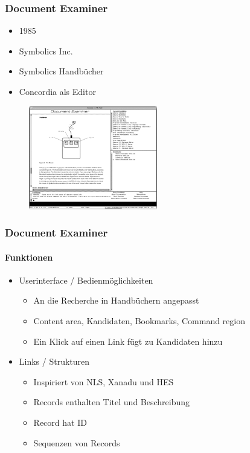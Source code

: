 \begin{frame}
\frametitle{Document Examiner}
\begin{itemize}
	\item 1985
	\item Symbolics Inc.
	\item Symbolics Handbücher
	\item Concordia als Editor
\end{itemize}

\begin{figure}[htbp]
	\centering
	\includegraphics[width=0.5\textwidth]{images/documentExaminer}
\end{figure}

\end{frame}

\begin{frame}
\frametitle{Document Examiner}
\framesubtitle{Funktionen}
	\begin{itemize}
		\item Userinterface / Bedienmöglichkeiten
		\begin{itemize}
			\item An die Recherche in Handbüchern angepasst
			\item Content area, Kandidaten, Bookmarks, Command region
			\item Ein Klick auf einen Link fügt zu Kandidaten hinzu
		\end{itemize}
		\item Links / Strukturen
		\begin{itemize}
			\item Inspiriert von NLS, Xanadu und HES
			\item Records enthalten Titel und Beschreibung
			\item Record hat ID
			\item Sequenzen von Records
		\end{itemize}
	\end{itemize}
\end{frame}